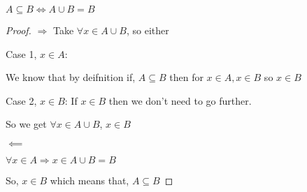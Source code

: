 \begin{theorem}
    $A \subseteq B \iff A \cup B = B$
\end{theorem}

 \begin{proof}
    $\Rightarrow$   
    Take $\forall x \in A \cup B$, so either
    
    Case 1, $x \in A$:

    We know that by deifnition if, $A \subseteq B$ then for  $x \in A, x \in B$ so  $x \in B$
    
    Case 2, $x \in B$:
    If $x \in B$ then we don't need to go further.


    So we get $\forall x \in A \cup B$,  $x \in B$

    $\impliedby$

    $\forall x \in A \Rightarrow x \in A \cup B = B$

    So,  $x \in B$ which means that, $A \subseteq B$
    
\end{proof}



